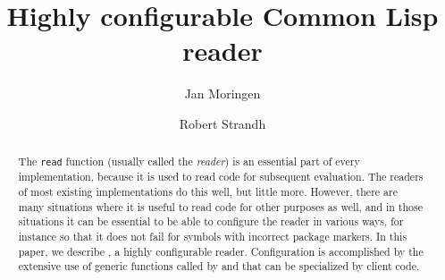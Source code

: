 \documentclass[format=sigconf]{acmart}
\def\inputtex#1{}
\begin{document}
\title{Highly configurable Common Lisp reader}

\author{Jan Moringen}

\author{Robert Strandh}

\begin{abstract}
The \cl{} \texttt{read} function (usually called the \cl{}
\emph{reader}) is an essential part of every \cl{} implementation,
because it is used to read \cl{} code for subsequent evaluation.  The
readers of most existing \cl{} implementations do this well, but
little more.  However, there are many situations where it is useful to
read \cl{} code for other purposes as well, and in those situations it
can be essential to be able to configure the reader in various ways,
for instance so that it does not fail for symbols with incorrect
package markers.  In this paper, we describe \eclector{}, a highly
configurable \cl{} reader.  Configuration is accomplished by the
extensive use of \cl{} generic functions called by \eclector{} and
that can be specialized by client code.
\end{abstract}

\maketitle













\end{document}
